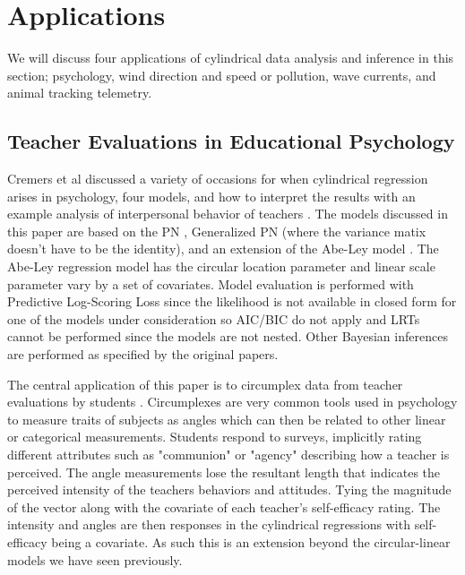 \section{Applications}\label{app_sec}


We will discuss four applications of cylindrical data analysis and inference in this section; psychology, wind direction and speed or pollution, wave currents, and animal tracking telemetry. 

\subsection{Teacher Evaluations in Educational Psychology} 


Cremers et al discussed a variety of occasions for when cylindrical regression arises in psychology, four models, and how to interpret the results with an example analysis of interpersonal behavior of teachers \cite{cremers_regression_2020}. The models discussed in this paper are based on the PN \cite{mastrantonio_joint_2018}, Generalized PN (where the variance matix doesn't have to be the identity), and an extension of the Abe-Ley model \cite{abe_tractable_2017}. The Abe-Ley regression model has the circular location parameter and linear scale parameter vary by a set of covariates. Model evaluation is performed with Predictive Log-Scoring Loss since the likelihood is not available in closed form for one of the models under consideration so AIC/BIC do not apply and LRTs cannot be performed since the models are not nested. Other Bayesian inferences are performed as specified by the original papers. 

The central application of this paper is to circumplex data from teacher evaluations by students \cite{cremers_regression_2020}. Circumplexes are very common tools used in psychology to measure traits of subjects as angles which can then be related to other linear or categorical measurements. Students respond to surveys, implicitly rating different attributes such as "communion" or "agency" describing how a teacher is perceived. The angle measurements lose the resultant length that indicates the perceived intensity of the teachers behaviors and attitudes. Tying the magnitude of the vector along with the covariate of each teacher's self-efficacy rating. The intensity and angles are then responses in the cylindrical regressions with self-efficacy being a covariate. As such this is an extension beyond the circular-linear models we have seen previously.

